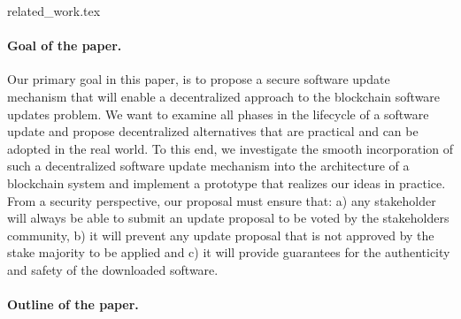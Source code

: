 
{related_work.tex}

\paragraph{Goal of the paper.}
Our primary goal in this paper, is to propose a secure software update mechanism that will enable a decentralized approach to the blockchain software updates problem. We want to examine all phases in the lifecycle of a software update and propose decentralized alternatives that are practical and can be adopted in the real world. To this end, we investigate the smooth incorporation of such a decentralized software update mechanism into the architecture of a blockchain system and implement a prototype that realizes our ideas in practice. From a security perspective, our proposal must ensure that:
a) any stakeholder will always be able to submit an update proposal to be voted by the stakeholders community, b) it will prevent any update proposal that is not approved by the stake majority to be applied and c) it will provide guarantees for the authenticity and safety of the downloaded software.

\paragraph{Outline of the paper.}
